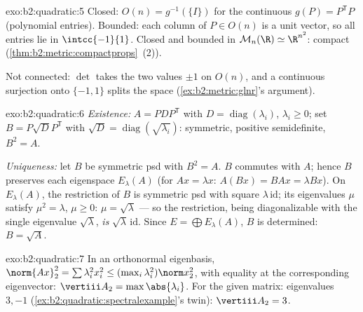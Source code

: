 \begin{solution}{exo:b2:quadratic:5}
Closed: $O(n) = g^{-1}(\{I\})$ for the continuous $g(P) =
P^{\mathsf T}P$ (polynomial entries). Bounded: each column of $P
\in O(n)$ is a unit vector, so all entries lie in $\intcc{-1}{1}$.
Closed and bounded in $\mathcal{M}_n(\R) \simeq \R^{n^2}$: compact
(\cref{thm:b2:metric:compactprops}~(2)).

Not connected: $\det$ takes the two values $\pm1$ on $O(n)$, and a
continuous surjection onto $\{-1, 1\}$ splits the space
(\cref{ex:b2:metric:glnr}'s argument).
\end{solution}

\begin{solution}{exo:b2:quadratic:6}
\emph{Existence:} $A = PDP^{\mathsf T}$ with $D =
\operatorname{diag}(\lambda_i)$, $\lambda_i \geq 0$; set $B =
P\sqrt D P^{\mathsf T}$ with $\sqrt D =
\operatorname{diag}(\sqrt{\lambda_i})$: symmetric, positive
semidefinite, $B^2 = A$.

\emph{Uniqueness:} let $B$ be symmetric psd with $B^2 = A$. $B$
commutes with $A$; hence $B$ preserves each eigenspace
$E_\lambda(A)$ (for $Ax = \lambda x$: $A(Bx) = BAx = \lambda Bx$).
On $E_\lambda(A)$, the restriction of $B$ is symmetric psd with
square $\lambda\,\mathrm{id}$; its eigenvalues $\mu$ satisfy $\mu^2
= \lambda$, $\mu \geq 0$: $\mu = \sqrt\lambda$ --- so the
restriction, being diagonalizable with the single eigenvalue
$\sqrt\lambda$, \emph{is} $\sqrt\lambda\,\mathrm{id}$. Since $E =
\bigoplus E_\lambda(A)$, $B$ is determined: $B = \sqrt A$.
\end{solution}

\begin{solution}{exo:b2:quadratic:7}
In an orthonormal eigenbasis, $\norm{Ax}_2^2 = \sum \lambda_i^2
x_i^2 \leq (\max_i \lambda_i^2)\norm x_2^2$, with equality at the
corresponding eigenvector: $\vertiii A_2 = \max\abs{\lambda_i}$.
For the given matrix: eigenvalues $3, -1$
(\cref{ex:b2:quadratic:spectralexample}'s twin):
$\vertiii A_2 = 3$.
\end{solution}

